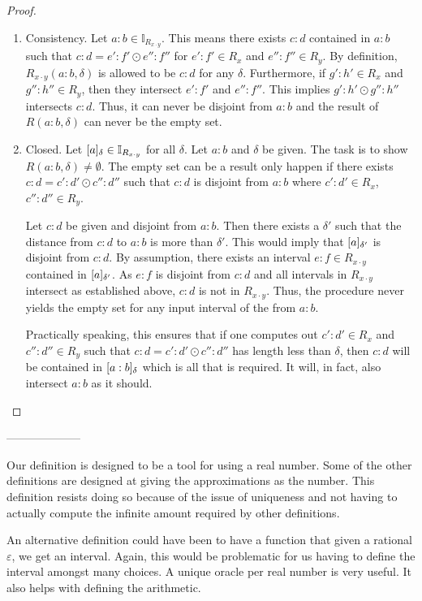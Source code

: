\begin{proof}
\begin{enumerate}
    \item Consistency. Let $a:b \in \mathbb{I}_{R_{x\cdot y}}$. This means there exists $c:d$ contained in $a:b$ such that $c:d = e':f' \odot e'':f''$ for $e':f' \in R_x$ and $e'':f'' \in R_y$. By definition, $R_{x \cdot y}(a:b,\delta)$ is allowed to be $ c:d$ for any $\delta$. Furthermore, if $g':h' \in R_x$ and $g'':h'' \in R_y$, then they intersect $e':f'$ and $e'':f''$. This implies $g':h' \odot g'' : h''$ intersects $c:d$. Thus, it can never be disjoint from $a:b$ and the result of $R(a:b, \delta)$ can never be the empty set. 
        
    \item Closed.  Let $\halo{a} \in \mathbb{I}_{R_{x\cdot y}}$ for all $\delta$. Let $a:b$ and $\delta$ be given. The task is to show $R(a:b, \delta) \neq \emptyset$. The empty set can be a result only happen if there exists $c:d = c':d' \odot c'':d''$ such that $c:d$ is disjoint from $a:b$ where $c':d' \in R_x$, $c'':d'' \in R_y$. 
    
    Let $c:d$ be given and disjoint from $a:b$. Then there exists a $\delta'$ such that the distance from $c:d$ to $a:b$ is more than $\delta'$. This would imply that $\halo[\delta']{a}$ is disjoint from $c:d$. By assumption, there exists an interval $e:f \in R_{x \cdot y}$ contained in $\halo[\delta']{a}$. As $e:f$ is disjoint from $c:d$ and all intervals in $R_{x \cdot y}$ intersect as established above, $c:d$ is not in $R_{x \cdot y}$. Thus, the procedure never yields the empty set for any input interval of the from $a:b$. 

    Practically speaking, this ensures that if one computes out $c':d' \in R_x$ and $c'':d'' \in R_y$ such that $c:d = c':d' \odot c'':d''$ has length less than $\delta$, then $c:d$ will be contained in $\halo{a:b}$ which is all that is required. It will, in fact, also intersect $a:b$ as it should.
    
\end{enumerate}

\end{proof}
--------------------


    
Our definition is designed to be a tool for using a real number. Some of the other definitions are designed at giving the approximations as the number. This definition resists doing so because of the issue of uniqueness and not having to actually compute the infinite amount required by other definitions. 

An alternative definition could have been to have a function that given a rational $\varepsilon$, we get an interval. Again, this would be problematic for us having to define the interval amongst many choices. A unique oracle per real number is very useful. It also helps with defining the arithmetic. 

